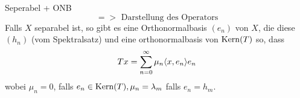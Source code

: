 \begin{karte}{Seperabel + ONB \[ => \text{ Darstellung des Operators} \]}
	Falls $X$ separabel ist, so gibt es eine Orthonormalbasis $(e_{n})$ von $X$, die diese $(h_{n})$ (vom Spektralsatz) und eine orthonormalbasis von $\mathop{\rm Kern}\nolimits(T)$ so, dass 
	\[ T x = \sum_{n = 0}^{\infty} \mu_{n} \langle x , e_{n} \rangle e_{n} \]
	wobei $\mu_{n} = 0$, falls $e_{n} \in \mathop{\rm Kern}\nolimits(T), \mu_{n} = \lambda_{m}$ falls $e_{n} = h_{m}$.
\end{karte}